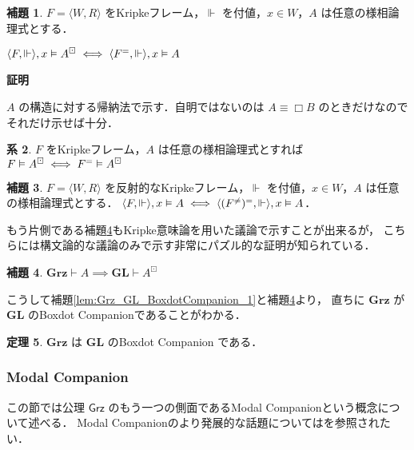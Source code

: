 \documentclass{jsarticle}
\makeatletter
\newcommand*{\Ax}[1]{\mathsf{#1}}
\newcommand*{\AxGrz}{\Ax{Grz}}
\newcommand*{\Logic}[1]{\mathbf{#1}}
\newcommand*{\LogicGL}{\Logic{GL}}
\newcommand*{\LogicGrz}{\Logic{Grz}}
\newcommand*{\structure}[1]{\langle #1 \rangle}
\theoremstyle{definition}
\newtheorem{theorem}{定理}[section]
\newtheorem{lemma}[theorem]{補題}
\newtheorem{corollary}[theorem]{系}
\renewcommand{\proofname}{証明}
\renewenvironment{proof}[1][\proofname]{\par
    \normalfont 
    \topsep6\p@\@plus6\p@\relax
    \trivlist
    \item\relax
    {\bfseries\gtfamily
    #1\@addpunct{.}}\hspace\labelsep\ignorespaces
    }{%
    \endtrivlist
    \@endpefalse
}
\makeatother
\begin{document}
\begin{lemma}
	$F = \structure{W, R}$ をKripkeフレーム，$\Vdash$ を付値，$x \in W$，$A$ は任意の様相論理式とする．

	$\structure{F, \Vdash}, x \vDash A^\boxdot \iff \structure{\reflexv{F}, \Vdash}, x \vDash A$
\end{lemma}

\begin{proof}
	$A$ の構造に対する帰納法で示す．自明ではないのは $A \equiv \Box B$ のときだけなのでそれだけ示せば十分．
\end{proof}

\begin{corollary}
	$F$ をKripkeフレーム，$A$ は任意の様相論理式とすれば $F \vDash A^\boxdot \iff F^{=} \vDash A^\boxdot$
\end{corollary}

\begin{lemma}
	$F = \structure{W, R}$ を反射的なKripkeフレーム，$\Vdash$ を付値，$x \in W$，$A$ は任意の様相論理式とする．
	$\structure{F,\Vdash}, x \vDash A \iff \structure{\reflexv{(\irreflxv{F})}, \Vdash}, x \vDash A$．
\end{lemma}


もう片側である補題\ref{lem:Grz_GL_BoxdotCompanion_2}もKripke意味論を用いた議論で示すことが出来るが，
こちらには構文論的な議論のみで示す非常にパズル的な証明\cite[pp163-164]{boolos_logic_1994}が知られている．

\begin{lemma}\label{lem:Grz_GL_BoxdotCompanion_2}
	$\LogicGrz \vdash A \implies \LogicGL \vdash A^\boxdot$
\end{lemma}


こうして補題\ref{lem:Grz_GL_BoxdotCompanion_1}と補題\ref{lem:Grz_GL_BoxdotCompanion_2}より，
直ちに $\LogicGrz$ が $\LogicGL$ のBoxdot Companionであることがわかる．

\begin{theorem}\label{thm:Grz_GL_BoxdotCompanion}
	$\LogicGrz$ は $\LogicGL$ のBoxdot Companion である．
\end{theorem}


\subsubsection{Modal Companion}\label{sect:modal_copanion}

この節では公理 $\AxGrz$ のもう一つの側面であるModal Companionという概念について述べる．
Modal Companionのより発展的な話題については\cite*{chagrov_modal_1992}を参照されたい．
\end{document}
